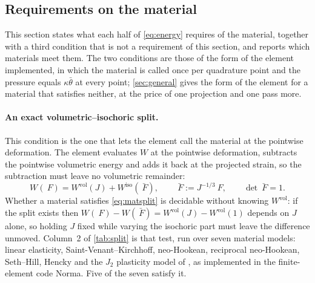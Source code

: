 \documentclass{article}
\newcommand{\F}{~F}
\newcommand{\supvol}{^{\mathrm{vol}}}
\newcommand{\supiso}{^{\mathrm{iso}}}
\theoremstyle{definition}
\theoremstyle{plain}
\begin{document}
\subsection{Requirements on the material}
\label{sec:matreq}

This section states what each half of \eqref{eq:energy} requires of the
material, together with a third condition that is not a requirement of this
section, and reports which materials meet them. The two conditions are
those of the form of the element implemented, in which the material is
called once per quadrature point and the pressure equals $\kappa\bar\theta$
at every point; \cref{sec:general} gives the form of the element for a
material that satisfies neither, at the price of one projection and one
pass more.

\paragraph{An exact volumetric--isochoric split.} This condition is
the one that lets the element call the material at the pointwise
deformation. The
element evaluates $W$ at the pointwise deformation, subtracts the pointwise
volumetric energy and adds it back at the projected strain, so the subtraction
must leave no volumetric remainder:
\begin{equation}
  \label{eq:matsplit}
  W(\F) = W\supvol(J) + W\supiso(\bar{\F}),
  \qquad
  \bar{\F} := J^{-1/3}\F,
  \qquad
  \det\bar{\F} = 1 .
\end{equation}
Whether a material satisfies \eqref{eq:matsplit} is decidable without knowing
$W\supvol$: if the split exists then $W(\F) - W(\bar{\F}) = W\supvol(J) -
W\supvol(1)$ depends on $J$ alone, so holding $J$ fixed while varying the
isochoric part must leave the difference unmoved. Column~2 of
\cref{tab:split} is that test, run over seven material models: linear
elasticity, Saint-Venant--Kirchhoff, neo-Hookean, reciprocal neo-Hookean,
Seth--Hill, Hencky and the $J_2$ plasticity model of \textcite{SimoHughes:1998},
as implemented in the finite-element code Norma. Five of the seven satisfy
it.
\end{document}
